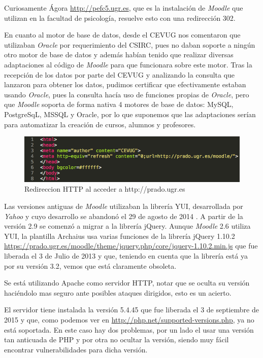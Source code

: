 \bigskip
Curiosamente Ágora \url{http://pefc5.ugr.es}, que es la instalación de \textit{Moodle} que utilizan en la facultad de psicología, resuelve esto con una redirección 302.

\bigskip
En cuanto al motor de base de datos, desde el CEVUG nos comentaron que utilizaban \textit{Oracle} por requerimiento del CSIRC, pues no daban soporte a ningún otro motor de base de datos y además habían tenido que realizar diversas adaptaciones al código de \textit{Moodle} para que funcionara sobre este motor. Tras la recepción de los datos por parte del CEVUG y analizando la consulta que lanzaron para obtener los datos, pudimos certificar que efectivamente estaban usando \textit{Oracle}, pues la consulta hacía uso de funciones propias de \textit{Oracle}, pero que \textit{Moodle} soporta de forma nativa 4 motores de base de datos: MySQL, PostgreSqL, MSSQL y Oracle, por lo que suponemos que las adaptaciones serían para automatizar la creación de cursos, alumnos y profesores.

\begin{figure}
\centering
\includegraphics[width=1.0\textwidth]{../screenshots/redireccionhttp}
\caption{Redireccion HTTP al acceder a http://prado.ugr.es}
\label{redireccionhttp}
\end{figure}

\bigskip
Las versiones antiguas de \textit{Moodle} utilizaban la librería YUI, desarrollada por \textit{Yahoo} y cuyo desarrollo se abandonó el 29 de agosto de 2014 \cite{art_01}. A partir de la versión 2.9 se comenzó a migrar a la librería jQuery. Aunque \textit{Moodle} 2.6 utiliza YUI, la plantilla Archaius usa varias funciones de la librería jQuery 1.10.2 \url{https://prado.ugr.es/moodle/theme/jquery.php/core/jquery-1.10.2.min.js} que fue liberada el 3 de Julio de 2013 y que, teniendo en cuenta que la librería está ya por su versión 3.2, vemos que está claramente obsoleta.

\bigskip
Se está utilizando Apache como servidor HTTP, notar que se oculta su versión haciéndolo mas seguro ante posibles ataques dirigidos, esto es un acierto.

\bigskip
El servidor tiene instalada la versión 5.4.45 que fue liberada el 3 de septiembre de 2015 y que, como podemos ver en \url{http://php.net/supported-versions.php}, ya no está soportada. En este caso hay dos problemas, por un lado el usar una versión tan anticuada de PHP y por otra no ocultar la versión, siendo muy fácil encontrar vulnerabilidades para dicha versión.

